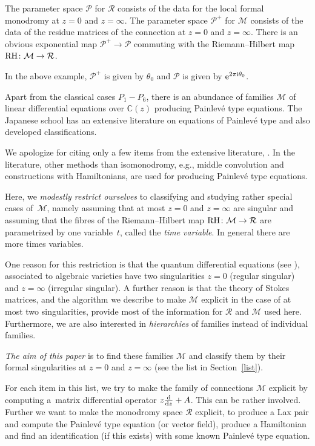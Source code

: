 \documentclass[pdftex]{sigma}
\numberwithin{equation}{section}
\begin{document}
The parameter space $\mathcal{P}$ for $\mathcal{R}$ consists of the data for the local formal monodromy at $z=0$ and $z=\infty$. The parameter space $\mathcal{P}^+$ for $\mathcal{M}$ consists of the data of the residue matrices of the connection at $z=0$ and $z=\infty$. There is an obvious exponential map $\mathcal{P}^+\rightarrow \mathcal{P}$
commuting with the Riemann--Hilbert map ${\rm RH}\colon \mathcal{M}\rightarrow \mathcal{R}$.

In the above example, $\mathcal{P}^+$ is given by $\theta_0$ and $\mathcal{P}$ is given by ${\rm e}^{2\pi {\rm i} \theta_0}$.

 Apart from the classical cases $P_1-P_6$, there is an abundance of families $\mathcal{M}$ of linear differential equations over $\mathbb{C}(z)$ producing Painlev\'e type equations. The Japanese school has an extensive literature on equations of Painlev\'e type and also developed classifications.

 We apologize for citing only a few items from the extensive
literature, \cite{F-I-K-N,H-K-N-S,J-M-U,K3,K2,K4,K-N-S,Mi,N-Y,O-O,O1}. In the literature, other methods than isomonodromy,
 e.g., middle convolution and constructions with Hamiltonians, are used for producing Painlev\'e type equations.

Here, we {\it modestly restrict ourselves} to classifying and studying rather special cases of~$\mathcal{M}$, namely assuming that at most $z=0$ and $z=\infty$ are singular and assuming that the fibres of the Riemann--Hilbert map
${\rm RH}\colon\mathcal{M}\rightarrow \mathcal{R}$ are parametrized by one variable~$t$, called the {\it time variable}.
In general there are more times variables.

 One reason for this restriction is that the quantum differential equations (see \cite{C-D-G,G-G-I,G2,G1}), associated to algebraic varieties have two singularities $z=0$ (regular singular) and $z=\infty$ (irregular singular). A further reason is that the theory of Stokes matrices,
and the algorithm we describe to make $\mathcal{M}$ explicit in the case of at most two singularities, provide most of the information for $\mathcal{R}$ and $\mathcal{M}$ used here.
Furthermore, we are also interested in {\it hierarchies} of families instead of individual families.

{\it The aim of this paper} is to find these families $\mathcal{M}$ and classify them by their formal singularities at $z=0$
and $z=\infty$ (see the list in Section~\ref{list}).


For each item in this list, we try to make the family of connections $\mathcal{M}$ explicit by computing a~matrix differential operator
$z\frac{{\rm d}}{{\rm d}z}+A$. This can be rather involved. Further we want to make the monodromy space $\mathcal{R}$
explicit, to produce a Lax pair and compute the Painlev\'e type equation (or vector field), produce a Hamiltonian and find
an identification (if this exists) with some known Painlev\'e type equation.
\end{document}
